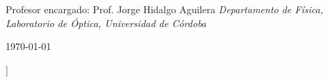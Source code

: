 \documentclass[11pt,letterpaper,twocolumn]{article}
\begin{document}
\begin{@twocolumnfalse}
\begin{center}
\begin{minipage}{0.75\textwidth}
{    \large{Profesor encargado: Prof. Jorge Hidalgo Aguilera} \newline
     \textit{Departamento de Física, Laboratorio de Óptica, Universidad de Córdoba\newline }
    \vspace{1mm} 
    
    \today %
}
\end{minipage}

\end{center}
\small

\vspace{11pt}

\end{@twocolumnfalse}]
\end{document}
